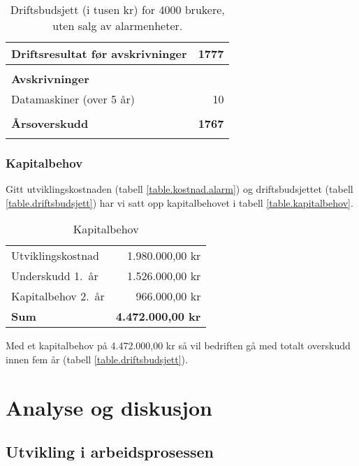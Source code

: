 \begin{table}
\begin{tabular}{lr}
    \\
    \textbf{Driftsresultat før avskrivninger}         &  \textbf{1777} \\
    \hline
    \\
    \textbf{Avskrivninger}                            & \\
    Datamaskiner (over 5 år)                          &    10 \\
    \\
    \textbf{Årsoverskudd}                             &  \textbf{1767} \\
    \thickhline
    \\
  \end{tabular}
  \caption{Driftsbudsjett (i tusen kr) for 4000 brukere, uten salg av alarmenheter.}
  \label{table.drift}
\end{table}


\subsection{Kapitalbehov}

Gitt utviklingskostnaden (tabell \vref{table.kostnad.alarm}) og
driftsbudsjettet (tabell \vref{table.driftsbudsjett}) har vi satt opp
kapitalbehovet i tabell \vref{table.kapitalbehov}.

\begin{table}
  \centering
  \begin{tabular}{lr}
    Utviklingskostnad   & 1.980.000,00 kr \\
    Underskudd 1.~år    & 1.526.000,00 kr \\
    Kapitalbehov 2.~år  &   966.000,00 kr \\
   \textbf{Sum} & \textbf{4.472.000,00 kr} \\
  \end{tabular}
  \caption{Kapitalbehov}
  \label{table.kapitalbehov}
\end{table}

Med et kapitalbehov på 4.472.000,00 kr så vil bedriften gå med totalt overskudd
innen fem år (tabell \vref{table.driftsbudsjett}).

\chapter{Analyse og diskusjon}

\section{Utvikling i arbeidsprosessen}
\label{prosessen}

